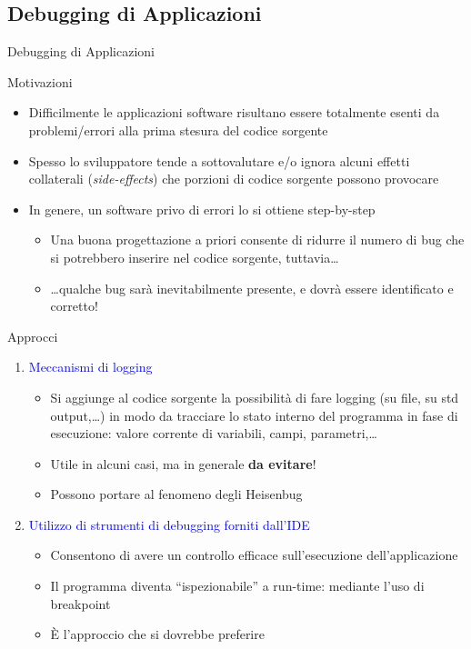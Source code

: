 \documentclass[presentation]{beamer}
\begin{document}
\subsection{Debugging di Applicazioni}
\begin{frame}[allowframebreaks]{Debugging di Applicazioni \cite{debugger,debugging}}
\begin{block}{Motivazioni}
\begin{itemize}
\item Difficilmente le applicazioni software risultano essere totalmente esenti da problemi/errori alla prima stesura del codice sorgente
\item Spesso lo sviluppatore tende a sottovalutare e/o ignora alcuni effetti collaterali (\emph{side-effects}) che porzioni di codice sorgente possono provocare
\item In genere, un software privo di errori lo si ottiene step-by-step
\begin{itemize}
\item Una buona progettazione a priori consente di ridurre il numero di bug che si potrebbero inserire nel codice sorgente, tuttavia\dots
\item \dots qualche bug sarà inevitabilmente presente, e dovrà essere identificato e corretto!
\end{itemize}
\end{itemize}
\end{block}

\begin{block}{Approcci}
\begin{enumerate}
\item \textcolor{blue}{Meccanismi di logging}
\begin{itemize}
\item Si aggiunge al codice sorgente la possibilità di fare logging (su file, su std output,\dots) in modo da tracciare lo stato interno del programma in fase di esecuzione: valore corrente di variabili, campi, parametri,\dots
\item Utile in alcuni casi, ma in generale \textbf{da evitare}!
\item Possono portare al fenomeno degli Heisenbug \cite{heisenbug}
\end{itemize}
\item \textcolor{blue}{Utilizzo di strumenti di debugging forniti dall'IDE}
\begin{itemize}
\item Consentono di avere un controllo efficace sull'esecuzione dell'applicazione
\item Il programma diventa ``ispezionabile'' a run-time: mediante l'uso di breakpoint
\item \`{E} l'approccio che si dovrebbe preferire
\end{itemize}
\end{enumerate}
\end{block}
\end{frame}
\end{document}
